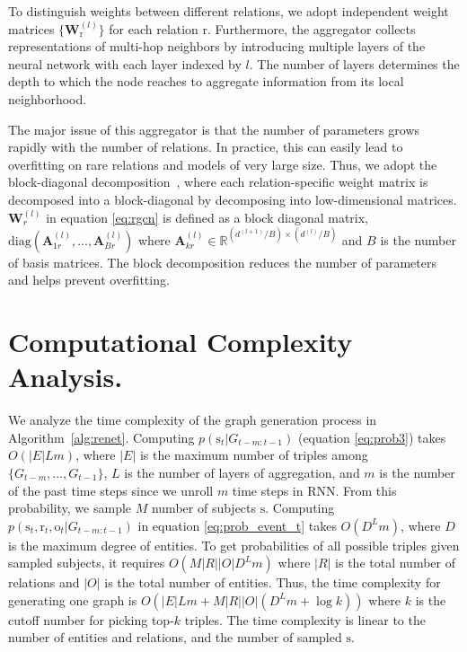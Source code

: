 \documentclass[11pt,a4paper]{article}
\newcommand{\bW}{\boldsymbol{W}}
\newcommand{\prob}{p}
\newcommand{\calE}{G}
\newcommand{\bs}{\mathrm{s}}
\newcommand{\br}{\mathrm{r}}
\newcommand{\bo}{\mathrm{o}}
\begin{document}
To distinguish weights between different relations, we adopt independent weight matrices $\{ \bW_\br^{(l)} \}$ for each relation $\br$. Furthermore, the aggregator collects representations of multi-hop neighbors by introducing multiple layers of the neural network with each layer indexed by $l$.
The number of layers determines the depth to which the node reaches to aggregate information from its local neighborhood. 

The major issue of this aggregator is that the number of parameters grows rapidly with the number of relations.
In practice, this can easily lead to overfitting on rare relations and models of very large size.
Thus, we adopt the block-diagonal decomposition~\citep{Schlichtkrull2018ModelingRD}, where each relation-specific weight matrix is decomposed into a block-diagonal by decomposing into low-dimensional matrices.
$\bW_r^{(l)}$ in equation \eqref{eq:rgcn} is defined as a block diagonal matrix, $\text{diag}(\mathbf{A}_{1r}^{(l)},..., \mathbf{A}_{Br}^{(l)})$ where {\small $\mathbf{A}_{kr}^{(l)} \in \mathbb{R}^{(d^{(l+1)}/B) \times (d^{(l)}/B)}$} and $B$ is the number of basis matrices.
The block decomposition reduces the number of parameters and helps prevent overfitting.

\section{Computational Complexity Analysis.}
\label{sec:complexity}
We analyze the time complexity of the graph generation process in Algorithm~\ref{alg:renet}. Computing $\prob(\bs_{t}|\allowbreak\calE_{t-m:t-1})$ (equation \eqref{eq:prob3}) takes $O(|E|Lm)$, where $|E|$ is the maximum number of triples among $\{G_{t-m},...,G_{t-1}\}$, $L$ is the number of layers of aggregation, and $m$ is the number of the past time steps since we unroll $m$ time steps in RNN. From this probability, we sample $M$ number of subjects $\bs$. Computing $\prob(\bs_t,\br_t,\bo_t|\calE_{t-m:t-1})$ in equation \eqref{eq:prob_event_t} takes $O(D^L m)$, where $D$ is the maximum degree of entities. To get probabilities of all possible triples given sampled subjects, it requires $O(M|R||O|D^Lm)$ where $|R|$ is the total number of relations and $|O|$ is the total number of entities. Thus, the time complexity for generating one graph is $O(|E|Lm+M|R||O|(D^L m + \log k))$ where $k$ is the cutoff number for picking top-$k$ triples. The time complexity is linear to the number of entities and relations, and the number of sampled $\bs$.
\end{document}
